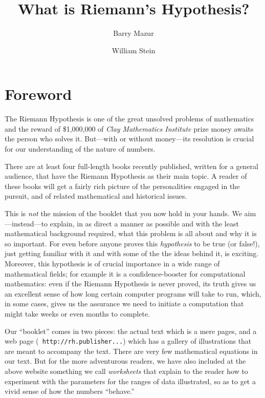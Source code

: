 \documentclass[11pt,draft]{article}
\title{What is Riemann's Hypothesis?}
\author{Barry Mazur \and William Stein}
\theoremstyle{plain}
\theoremstyle{definition}
\numberwithin{equation}{section}
\numberwithin{figure}{section}
\numberwithin{table}{section}
\begin{document}
\maketitle
\tableofcontents

\section{\label{foreword}Foreword}

\bigskip

The Riemann Hypothesis is one of the great unsolved problems of
mathematics and the reward of \$1,000,000 of {\em Clay Mathematics
  Institute} prize money awaits the person who solves it. But---with
or without money---its resolution is crucial for our understanding of
the nature of numbers.

There are at least four full-length books recently published, written
for a general audience, that have the Riemann Hypothesis as their main
topic.  A reader of these books will get a fairly rich picture of the
personalities engaged in the pursuit, and of related mathematical and
historical issues.
     
This is {\em not} the mission of the booklet that you now hold in your
hands. We aim---instead---to explain, in as direct a manner as
possible and with the least mathematical background required, what
this problem is all about and why it is so important. For even before
anyone proves this {\em hypothesis} to be true (or false!), just
getting familiar with it and with some of the the ideas behind it, is
exciting.  Moreover, this hypothesis is of crucial importance in a
wide range of mathematical fields; for example it is a
confidence-booster for computational mathematics: even if the Riemann
Hypothesis is never proved, its truth gives us an excellent sense of
how long certain computer programs will take to run, which, in some
cases, gives us the assurance we need to initiate a computation that
might take weeks or even months to complete.

      
Our ``booklet'' comes in two pieces: the actual text which is a mere
\pageref{lastpage} pages, and a web page ({\tt
  http://rh.publisher...}) which has a gallery of illustrations that
are meant to accompany the text.  There are very few mathematical
equations in our text.  But for the more adventurous readers, we have
also included at the above website something we call {\em worksheets}
that explain to the reader how to experiment with the parameters for
the ranges of data illustrated, so as to get a vivid sense of how the
numbers ``behave.''
 
\end{document}
